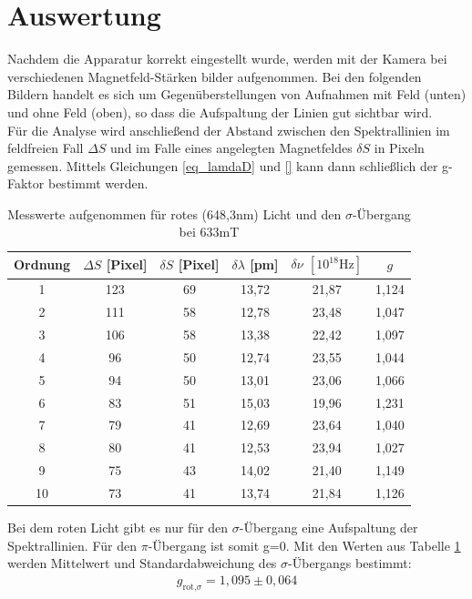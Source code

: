 \section{Auswertung}
Nachdem die Apparatur korrekt eingestellt wurde, werden mit der Kamera bei verschiedenen Magnetfeld-Stärken bilder aufgenommen. Bei den folgenden Bildern handelt es sich um Gegenüberstellungen von Aufnahmen mit Feld (unten) und ohne Feld (oben), so dass die Aufspaltung der Linien gut sichtbar wird.\\
Für die Analyse wird anschließend der Abstand zwischen den Spektrallinien im feldfreien Fall $\Delta S$ und im Falle eines angelegten Magnetfeldes $\delta S$ in Pixeln gemessen. Mittels Gleichungen \eqref{eq_lamdaD} und \eqref{} kann dann schließlich der g-Faktor bestimmt werden.
\begin{table}[htbp]
    \begin{tabular}{|c|c|c|c|c|c|}
        Ordnung & $\Delta S$ [Pixel]    & $\delta S$ [Pixel]    &$\delta \lambda$ [pm]  & $\delta \nu$ $[10^{18}\text{Hz}]$ &   $g$\\\hline
        1&  123&    69& 13,72&  21,87&  1,124\\\hline
        2&  111&    58& 12,78&  23,48&  1,047\\\hline
        3&  106&    58& 13,38&  22,42&  1,097\\\hline
        4&  96&     50& 12,74&  23,55&  1,044\\\hline
        5&  94&     50& 13,01&  23,06&  1,066\\\hline
        6&  83&     51& 15,03&  19,96&  1,231\\\hline
        7&  79&     41& 12,69&  23,64&  1,040\\\hline
        8&  80&     41& 12,53&  23,94&  1,027\\\hline
        9&  75&     43& 14,02&  21,40&  1,149\\\hline
        10& 73&     41& 13,74&  21,84&  1,126\\\hline
    \end{tabular}
    \caption{Messwerte aufgenommen für rotes (648,3nm) Licht und den $\sigma$-Übergang bei 633mT}
    \label{tab_red_sigma}
\end{table}

Bei dem roten Licht gibt es nur für den $\sigma$-Übergang eine Aufspaltung der Spektrallinien. Für den $\pi$-Übergang ist somit g=0. Mit den Werten aus Tabelle \ref{tab_red_sigma} werden Mittelwert und Standardabweichung des $\sigma$-Übergangs bestimmt:
\begin{align*}
g_{\text{rot,}\sigma}=1,095\pm0,064
\end{align*}

